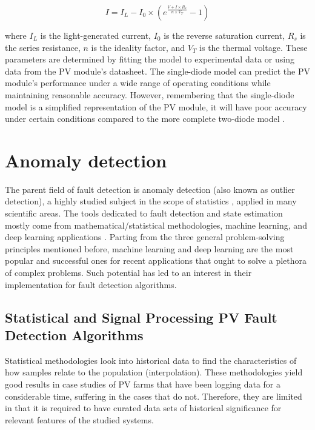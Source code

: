 \begin{equation}
I = I_{L} - I_{0} \times (e^{\frac{V + I \times R_{s}}{n \times V_T}} - 1)
\end{equation}

where $I_{L}$ is the light-generated current, $I_{0}$ is the reverse saturation current, $R_{s}$ is the series resistance, $n$ is the ideality factor, and $V_{T}$ is the thermal voltage. These parameters are determined by fitting the model to experimental data or using data from the PV module's datasheet. The single-diode model can predict the PV module's performance under a wide range of operating conditions while maintaining reasonable accuracy. However, remembering that the single-diode model is a simplified representation of the PV module, it will have poor accuracy under certain conditions compared to the more complete two-diode model \cite{Godina2017}.


\section{Anomaly detection}

The parent field of fault detection is anomaly detection (also known as outlier detection), a highly studied subject in the scope of statistics \cite{Prasad2009}, applied in many scientific areas. The tools dedicated to fault detection and state estimation mostly come from mathematical/statistical methodologies, machine learning, and deep learning applications \cite{AIPV}. Parting from the three general problem-solving principles mentioned before, machine learning and deep learning are the most popular and successful ones for recent applications that ought to solve a plethora of complex problems. Such potential has led to an interest in their implementation for fault detection algorithms.

\subsection{Statistical and Signal Processing PV Fault Detection Algorithms}

Statistical methodologies look into historical data to find the characteristics of how samples relate to the population (interpolation). These methodologies yield good results in case studies of PV farms that have been logging data for a considerable time, suffering in the cases that do not. Therefore, they are limited in that it is required to have curated data sets of historical significance for relevant features of the studied systems.

